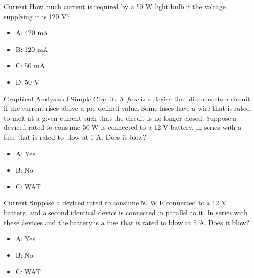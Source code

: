 \documentclass{beamer}
\begin{document}
\begin{frame}{Current}
How much current is required by a 50 W light bulb if the voltage supplying it is 120 V?
\begin{itemize}
\item A: 420 mA
\item B: 120 mA
\item C: 50 mA
\item D: 50 V
\end{itemize}
\end{frame}

\begin{frame}{Graphical Analysis of Simple Circuits}
A \textit{fuse} is a device that disconnects a circuit if the current rises above a pre-defined value.  Some fuses have a wire that is rated to melt at a given current such that the circuit is no longer closed.  Suppose a deviced rated to consume 50 W is connected to a 12 V battery, in series with a fuse that is rated to blow at 1 A.  Does it blow?
\begin{itemize}
\item A: Yes
\item B: No
\item C: WAT
\end{itemize}
\end{frame}

\begin{frame}{Current}
Suppose a deviced rated to consume 50 W is connected to a 12 V battery, and a second identical device is connected in parallel to it.  In series with these devices and the battery is a fuse that is rated to blow at 5 A.  Does it blow?
\begin{itemize}
\item A: Yes
\item B: No
\item C: WAT
\end{itemize}
\end{frame}
\end{document}
